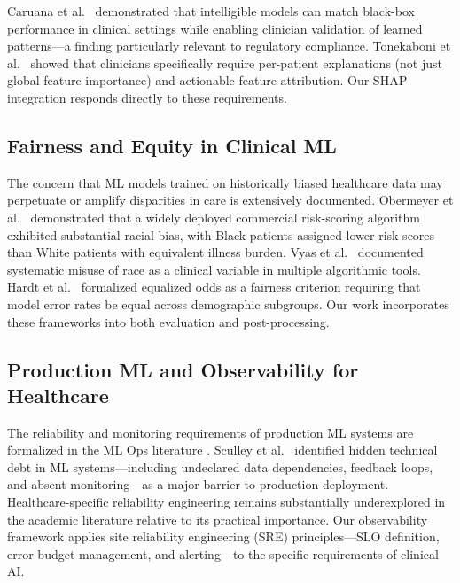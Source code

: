 \documentclass[11pt,letterpaper]{article}
\begin{document}
Caruana et al.\ \citep{caruana2015intelligible} demonstrated that intelligible models can match black-box performance in clinical settings while enabling clinician validation of learned patterns---a finding particularly relevant to regulatory compliance. Tonekaboni et al.\ \citep{tonekaboni2019clinicians_want} showed that clinicians specifically require per-patient explanations (not just global feature importance) and actionable feature attribution. Our SHAP integration responds directly to these requirements.

\subsection{Fairness and Equity in Clinical ML}

The concern that ML models trained on historically biased healthcare data may perpetuate or amplify disparities in care is extensively documented. Obermeyer et al.\ \citep{obermeyer2019dissecting} demonstrated that a widely deployed commercial risk-scoring algorithm exhibited substantial racial bias, with Black patients assigned lower risk scores than White patients with equivalent illness burden. Vyas et al.\ \citep{vyas2020hidden} documented systematic misuse of race as a clinical variable in multiple algorithmic tools. Hardt et al.\ \citep{hardt2016equality} formalized equalized odds as a fairness criterion requiring that model error rates be equal across demographic subgroups. Our work incorporates these frameworks into both evaluation and post-processing.

\subsection{Production ML and Observability for Healthcare}

The reliability and monitoring requirements of production ML systems are formalized in the ML Ops literature \citep{sculley2015hidden,sato2019continuous}. Sculley et al.\ \citep{sculley2015hidden} identified hidden technical debt in ML systems---including undeclared data dependencies, feedback loops, and absent monitoring---as a major barrier to production deployment. Healthcare-specific reliability engineering remains substantially underexplored in the academic literature relative to its practical importance. Our observability framework applies site reliability engineering (SRE) principles---SLO definition, error budget management, and alerting---to the specific requirements of clinical AI.
\end{document}
